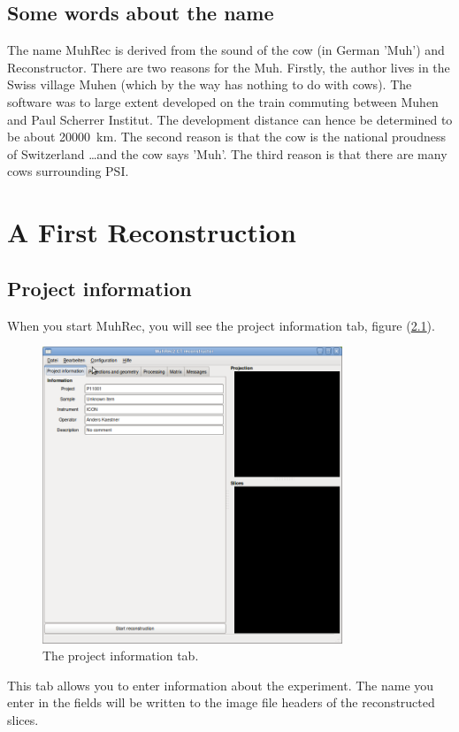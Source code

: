 \documentclass[a4paper]{scrreprt}
\begin{document}
\section{Some words about the name}
The name MuhRec is derived from the sound of the cow (in German 'Muh') and Reconstructor.
There are two reasons for the Muh. Firstly, the author lives in the Swiss village Muhen
(which by the way has nothing to do with cows). The software was to large extent developed
on the train commuting between Muhen and Paul Scherrer Institut. The development distance
can hence be determined to be about 20000~km. The second reason is that the cow is the
national proudness of Switzerland \ldots and the cow says 'Muh'. The third reason is that there are many cows surrounding PSI.

\chapter{A First Reconstruction}
\section{Project information}
When you start MuhRec, you will see the project information tab, figure
(\ref{fig_projectinfotab}).
\begin{figure}[ht!]
\centering
 \includegraphics[width=0.8\textwidth]{figures/ProjectInfoTab.png}
\caption{The project information tab.}\label{fig_projectinfotab}
\end{figure}
This tab allows you to enter information about the experiment. The name you
enter in the fields will be written to the image file headers of the
reconstructed slices.
\end{document}
